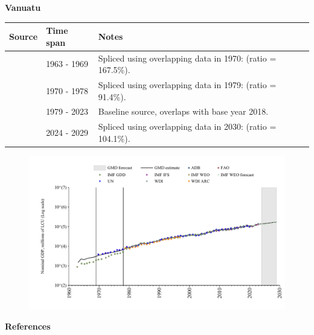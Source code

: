 \documentclass[12pt,a4paper,landscape]{article}
\begin{document}
\begin{adjustbox}{max totalsize={\paperwidth}{\paperheight},center}
\begin{minipage}[t][\textheight][t]{\textwidth}
\vspace*{0.5cm}
{}
\begin{center}
{\Large\bfseries Vanuatu}
\end{center}
\vspace{0.5cm}
\begin{table}[H]
\centering
\small
\begin{tabular}{|l|l|l|}
\hline
\textbf{Source} & \textbf{Time span} & \textbf{Notes} \\
\hline
\rowcolor{white}\cite{IMF_GDD}& 1963 - 1969 &Spliced using overlapping data in 1970: (ratio = 167.5\%).\\
\rowcolor{lightgray}\cite{UN}& 1970 - 1978 &Spliced using overlapping data in 1979: (ratio = 91.4\%).\\
\rowcolor{white}\cite{WDI}& 1979 - 2023 &Baseline source, overlaps with base year 2018.\\
\rowcolor{lightgray}\cite{IMF_WEO_forecast}& 2024 - 2029 &Spliced using overlapping data in 2030: (ratio = 104.1\%).\\
\hline
\end{tabular}
\end{table}
\begin{figure}[H]
\centering
\includegraphics[width=\textwidth,height=0.6\textheight,keepaspectratio]{graphs/VUT_nGDP.pdf}
\end{figure}
\end{minipage}
\end{adjustbox}
{}
\begin{center}
{\Large\bfseries References}
\end{center}
\small


\end{document}
